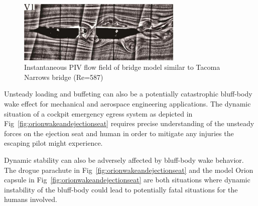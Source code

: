 \documentclass[journal]{new-aiaa}
\begin{document}
\begin{figure}[H]
\begin{center}
\includegraphics[width=0.7\textwidth]{Images/logan/yuan2017investigation_TacomaNarrowsWake.pdf}
\caption{ Instantaneous PIV flow field of bridge model similar to Tacoma Narrows bridge (Re=587) \cite{yuan2017investigation} }
\label{fig:tacomanarrowswake}
\end{center}
\end{figure}

Unsteady loading and buffeting can also be a potentially catastrophic bluff-body wake effect for mechanical and aerospace engineering applications.  The dynamic situation of a cockpit emergency egress system as depicted in Fig~\ref{fig:orionwakeandejectionseat} requires precise understanding of the unsteady forces on the ejection seat and human in order to mitigate any injuries the escaping pilot might experience.

Dynamic stability can also be adversely affected by bluff-body wake behavior.  The drogue parachute in Fig~\ref{fig:orionwakeandejectionseat} and the model Orion capsule in Fig~\ref{fig:orionwakeandejectionseat} are both situations where dynamic instability of the bluff-body could lead to potentially fatal situations for the humans involved.
\end{document}
